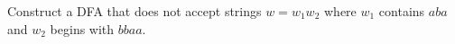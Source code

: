 Construct a DFA that does not accept strings $w = w_1 w_2$
where $w_1$ contains $aba$ and $w_2$ begins with $bbaa$.
